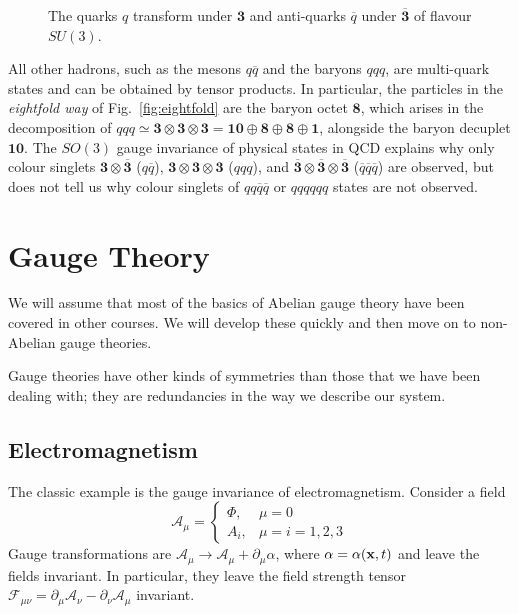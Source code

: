 \begin{figure}[btph]
  \centering
  \def\svgwidth{0.9\columnwidth}
  
  \caption{The quarks $q$ transform under $\boldsymbol 3$ and anti-quarks $\overline{q}{}$ under $\overline{\boldsymbol 3}{}$ of flavour $SU(3)$.}
  \label{fig:quarks}
\end{figure}

All other hadrons, such as the mesons $q \overline{q}{}$ and the baryons $qqq$, are multi-quark states and can be obtained by tensor products.  In particular, the particles in the \emph{eightfold way} of Fig.~\ref{fig:eightfold} are the baryon octet $\boldsymbol 8$, which arises in the decomposition of $qqq \simeq \boldsymbol 3 \otimes \boldsymbol 3 \otimes \boldsymbol 3 = \boldsymbol{10} \oplus \boldsymbol 8 \oplus \boldsymbol 8 \oplus \boldsymbol 1$, alongside the baryon decuplet $\boldsymbol{10}$.
The $SO(3)$ gauge invariance of physical states in QCD explains why only colour singlets $\boldsymbol 3 \otimes \overline{\boldsymbol 3}{}$ ($q \overline{q}{}$), $\boldsymbol 3 \otimes \boldsymbol 3 \otimes \boldsymbol 3$ ($q q q$), and $\overline{\boldsymbol 3}{} \otimes \overline{\boldsymbol 3}{} \otimes \overline{\boldsymbol 3}{}$ ($\overline{q}{} \overline{q}{} \overline{q}{}$) are observed, but does not tell us why colour singlets of $qq \overline{q}{} \overline{q}{}$ or $qq qq qq$ states are not observed.

\chapter{Gauge Theory}%
\label{cha:gauge_theory}

We will assume that most of the basics of Abelian gauge theory have been covered in other courses. We will develop these quickly and then move on to non-Abelian gauge theories.

Gauge theories have other kinds of symmetries than those that we have been dealing with; they are redundancies in the way we describe our system.

\section{Electromagnetism}%
\label{sec:electromagnetism}

The classic example is the gauge invariance of electromagnetism. Consider a field
\begin{equation}
  \mathcal{A}_{\mu} = 
  \begin{cases}
    \Phi, & \mu = 0 \\
    A_{i}, & \mu = i = 1, 2, 3
  \end{cases}
\end{equation}
Gauge transformations are $\mathcal{A}_{\mu} \to \mathcal{A}_{\mu} + \partial_{\mu} \alpha$, where $\alpha = \alpha(\vb{x}, t)$ and leave the fields invariant.
In particular, they leave the field strength tensor $\mathcal{F}_{\mu\nu} = \partial_{\mu} \mathcal{A}_{\nu} - \partial_{\nu} \mathcal{A}_{\mu}$ invariant.

